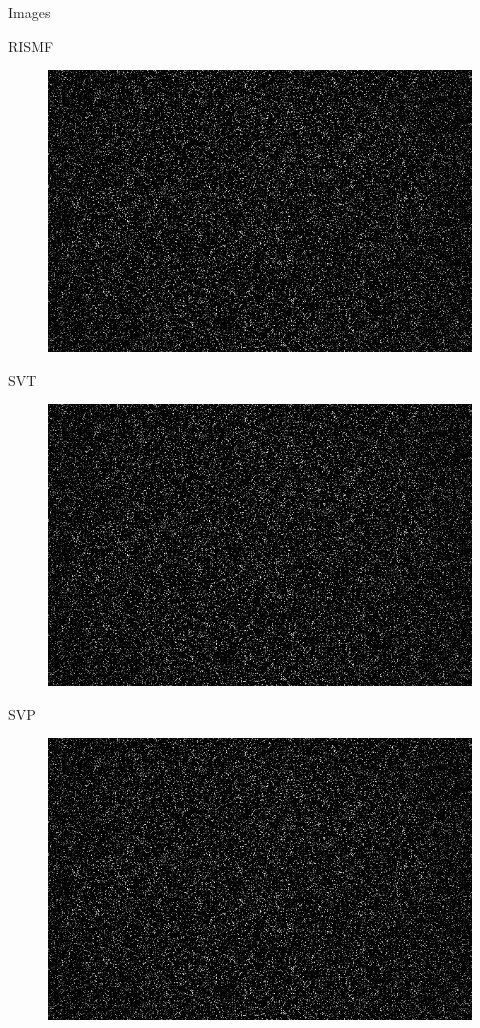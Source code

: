 \documentclass{beamer}
\begin{document}
\begin{frame}{Images}
	\vspace{-0.2cm}
	\begin{multicols}{3}
		\vspace{-0.2cm}
		\hspace{0.5cm}RISMF
		\vspace{-0.2cm}
		\begin{figure}[h]
			\centering
			\includegraphics[width=0.8\linewidth]{./../data/images/presentation/p4_2_01_20.jpg}
		\end{figure}
		\vspace{-0.2cm}
		\hspace{0.5cm}SVT
		\vspace{-0.2cm}
		\begin{figure}[h]
			\centering
			\includegraphics[width=0.8\linewidth]{./../data/images/presentation/p4_2_01_20.jpg}
		\end{figure}
		\vspace{-0.2cm}
		\hspace{0.5cm}SVP
		\vspace{-0.2cm}
		\begin{figure}[h]
			\centering
			\includegraphics[width=0.8\linewidth]{./../data/images/presentation/p4_2_01_20.jpg}

\end{figure}
\end{multicols}
\end{frame}
\end{document}
